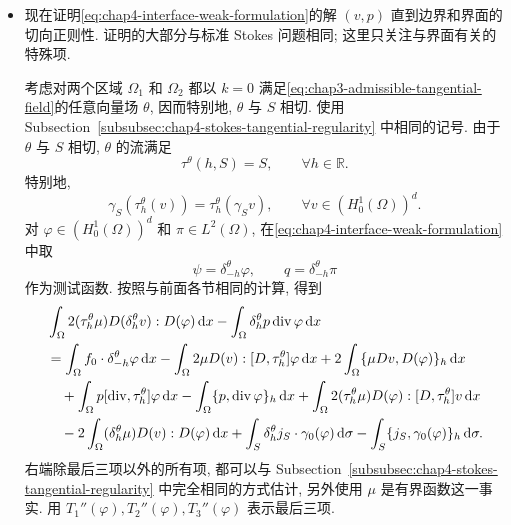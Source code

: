\begin{Proof}
\begin{itemize}
\item 现在证明\eqref{eq:chap4-interface-weak-formulation}的解 $(v,p)$ 直到边界和界面的切向正则性. 证明的大部分与标准 Stokes 问题相同; 这里只关注与界面有关的特殊项.

考虑对两个区域 $\Omega_1$ 和 $\Omega_2$ 都以 $k=0$ 满足\eqref{eq:chap3-admissible-tangential-field}的任意向量场 $\theta$, 因而特别地, $\theta$ 与 $S$ 相切. 使用 Subsection~\ref{subsubsec:chap4-stokes-tangential-regularity} 中相同的记号. 由于 $\theta$ 与 $S$ 相切, $\theta$ 的流满足
\[
 \tau^\theta(h,S)=S,
 \qquad\forall h\in\mathbb R.
\]
特别地,
\[
 \gamma_S(\tau_h^\theta(v))=\tau_h^\theta(\gamma_Sv),
 \qquad\forall v\in(H_0^1(\Omega))^d.
\]
对 $\varphi\in(H_0^1(\Omega))^d$ 和 $\pi\in L^2(\Omega)$, 在\eqref{eq:chap4-interface-weak-formulation}中取
\[
 \psi=\delta_{-h}^\theta\varphi,
 \qquad q=\delta_{-h}^\theta\pi
\]
作为测试函数. 按照与前面各节相同的计算, 得到
\begin{align}
 &\int_\Omega2(\tau_h^\theta\mu)D(\delta_h^\theta v):D(\varphi)\,\mathrm dx
 -\int_\Omega\delta_h^\theta p\operatorname{div}\varphi\,\mathrm dx\notag\\
 &=\int_\Omega f_0\cdot\delta_{-h}^\theta\varphi\,\mathrm dx
 -\int_\Omega2\mu D(v):[D,\tau_h^\theta]\varphi\,\mathrm dx
 +2\int_\Omega\{\mu Dv,D(\varphi)\}_h\,\mathrm dx\notag\\
 &\quad+\int_\Omega p[\operatorname{div},\tau_h^\theta]\varphi\,\mathrm dx
 -\int_\Omega\{p,\operatorname{div}\varphi\}_h\,\mathrm dx
 +\int_\Omega2(\tau_h^\theta\mu)D(\varphi):[D,\tau_h^\theta]v\,\mathrm dx\notag\\
 &\quad-2\int_\Omega(\delta_h^\theta\mu)D(v):D(\varphi)\,\mathrm dx
 +\int_S\delta_h^\theta j_S\cdot\gamma_0(\varphi)\,\mathrm d\sigma
 -\int_S\{j_S,\gamma_0(\varphi)\}_h\,\mathrm d\sigma.
 \label{eq:chap4-interface-tangential-identity}
\end{align}
右端除最后三项以外的所有项, 都可以与 Subsection~\ref{subsubsec:chap4-stokes-tangential-regularity} 中完全相同的方式估计, 另外使用 $\mu$ 是有界函数这一事实. 用 $T_1''(\varphi),T_2''(\varphi),T_3''(\varphi)$ 表示最后三项.


\end{itemize}
\end{Proof}
